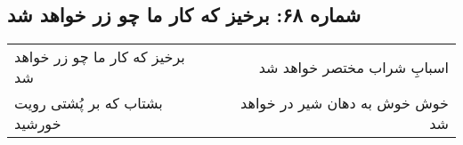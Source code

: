 \begin{center}
\section*{شماره ۶۸: برخیز که کار ما چو زر خواهد شد}
\label{sec:068}
\begin{longtable}{l p{0.5cm} r}
برخیز که کار ما چو زر خواهد شد
&&
اسبابِ شراب مختصر خواهد شد
\\
بشتاب که بر پُشتی رویت خورشید
&&
خوش خوش به دهان شیر در خواهد شد
\\
\end{longtable}
\end{center}
